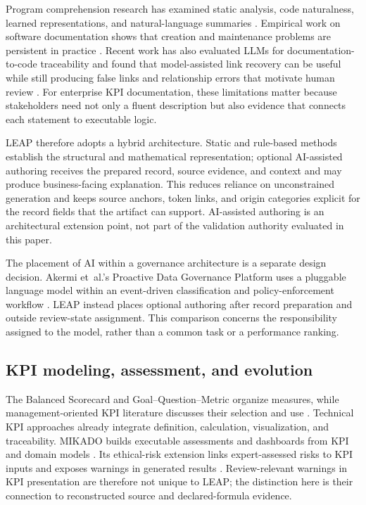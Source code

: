 \documentclass[a4paper,fleqn]{cas-dc}
\newcommand{\tool}{\textsc{LEAP}}
\begin{document}
Program comprehension research has examined static analysis, code naturalness, learned representations, and natural-language summaries \citep{Allamanis2018}. Empirical work on software documentation shows that creation and maintenance problems are persistent in practice \citep{Aghajani2019}. Recent work has also evaluated LLMs for documentation-to-code traceability and found that model-assisted link recovery can be useful while still producing false links and relationship errors that motivate human review \citep{Alor2026}. For enterprise KPI documentation, these limitations matter because stakeholders need not only a fluent description but also evidence that connects each statement to executable logic.

\tool{} therefore adopts a hybrid architecture. Static and rule-based methods establish the structural and mathematical representation; optional AI-assisted authoring receives the prepared record, source evidence, and context and may produce business-facing explanation. This reduces reliance on unconstrained generation and keeps source anchors, token links, and origin categories explicit for the record fields that the artifact can support. AI-assisted authoring is an architectural extension point, not part of the validation authority evaluated in this paper.

The placement of AI within a governance architecture is a separate design decision. Akermi et~al.'s Proactive Data Governance Platform uses a pluggable language model within an event-driven classification and policy-enforcement workflow \citep{Akermi2026PDGP}. LEAP instead places optional authoring after record preparation and outside review-state assignment. This comparison concerns the responsibility assigned to the model, rather than a common task or a performance ranking.

\subsection{KPI modeling, assessment, and evolution}

The Balanced Scorecard \citep{Kaplan1996} and Goal--Question--Metric \citep{VanSolingen2002} organize measures, while management-oriented KPI literature discusses their selection and use \citep{Parmenter2015,Eckerson2011,Marr2012}. Technical KPI approaches already integrate definition, calculation, visualization, and traceability. MIKADO builds executable assessments and dashboards from KPI and domain models \citep{DeSanctis2022}. Its ethical-risk extension links expert-assessed risks to KPI inputs and exposes warnings in generated results \citep{DeSanctis2025Ethics}. Review-relevant warnings in KPI presentation are therefore not unique to LEAP; the distinction here is their connection to reconstructed source and declared-formula evidence.
\end{document}
